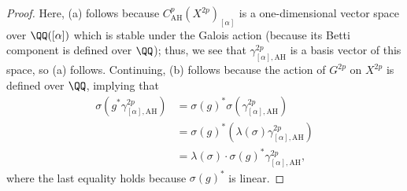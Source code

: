 \documentclass[../thesis.tex]{subfiles}
\begin{document}
\begin{proof}
	Here, (a) follows because $C^{p}_{\mathrm{AH}}\left(X^{2p}\right)_{[\alpha]}$ is a one-dimensional vector space over $\QQ([\alpha])$ which is stable under the Galois action (because its Betti component is defined over $\QQ$); thus, we see that $\gamma_{[\alpha],\mathrm{AH}}^{2p}$ is a basis vector of this space, so (a) follows. Continuing, (b) follows because the action of $G^{2p}$ on $X^{2p}$ is defined over $\QQ$, implying that
	\begin{align*}
		\sigma\left(g^*\gamma_{[\alpha],\mathrm{AH}}^{2p}\right) &= \sigma(g)^*\sigma\left(\gamma_{[\alpha],\mathrm{AH}}^{2p}\right) \\
		&= \sigma(g)^*\left(\lambda(\sigma)\gamma_{[\alpha],\mathrm{AH}}^{2p}\right) \\
		&= \lambda(\sigma)\cdot\sigma(g)^*\gamma_{[\alpha],\mathrm{AH}}^{2p},
	\end{align*}
	where the last equality holds because $\sigma(g)^*$ is linear.


\end{proof}
\end{document}
